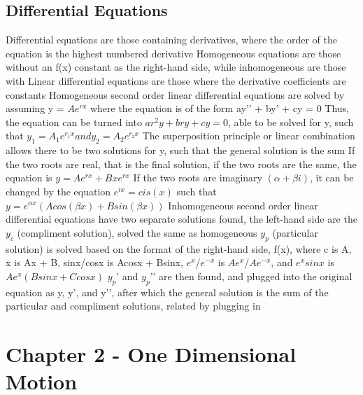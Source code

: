 \documentclass[11 pt, twoside]{article}
\newenvironment{outline*}
{
	\begin{outline}[enumerate]
	}
	{\end{outline}
}
\begin{document}
\subsection{Differential Equations}
\begin{outline*}
\1 Differential equations are those containing derivatives, where the order of the equation is the highest numbered derivative
\2 Homogeneous equations are those without an f(x) constant as the right-hand side, while inhomogeneous are those with
\2 Linear differential equations are those where the derivative coefficients are constants
\1 Homogeneous second order linear differential equations are solved by assuming y = $Ae^{rx}$ where the equation is of the form ay’’ + by’ + cy = 0
\2 Thus, the equation can be turned into $ar^2y + bry + cy = 0$, able to be solved for y, such that $y_1 = A_1e^{r_1x} and y_2 = A_2e^{r_2x}$
\2 The superposition principle or linear combination allows there to be two solutions for y, such that the general solution is the sum
\2 If the two roots are real, that is the final solution, if the two roots are the same, the equation is $y = Ae^{rx} + Bxe^{rx}$
\2 If the two roots are imaginary $(\alpha + \beta i)$, it can be changed by the equation $e^{ix} = cis(x)$ such that $y = e^{\alpha x}(Acos(\beta x) + Bsin(\beta x))$
\1 Inhomogeneous second order linear differential equations have two separate solutions found, the left-hand side are the $y_c$ (compliment solution), solved the same as homogeneous
\2 $y_p$ (particular solution) is solved based on the format of the right-hand side, f(x), where c is A, x is Ax + B, sinx/cosx is Acosx + Bsinx, $e^x$/$e^{-x}$ is $Ae^x$/$Ae^{-x}$, and $e^xsinx$ is $Ae^x(Bsinx + Ccosx)$
\2 $y_p$’ and $y_p$’’ are then found, and plugged into the original equation as y, y’, and y’’, after which the general solution is the sum of the particular and compliment solutions, related by plugging in
\end{outline*}
\section{Chapter 2 - One Dimensional Motion}
\end{document}
